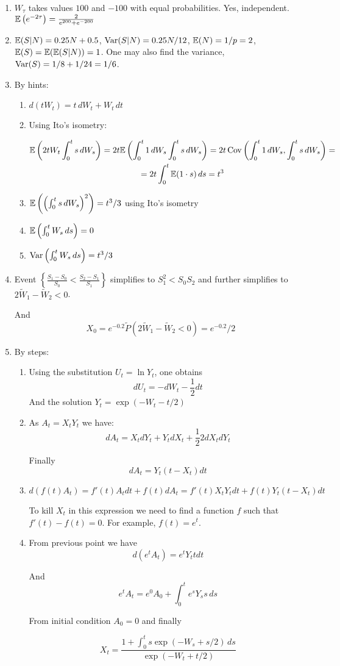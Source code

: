 \documentclass[12pt, a4paper]{article}
\begin{document}
\begin{enumerate}
\item $W_{\tau}$ takes values $100$ and $-100$ with equal probabilities. Yes, independent. $\mathbb{E}\left(  e^{-2\tau} \right) = \frac{2}{e^{200}+e^{-200}}$
\item $\mathbb{E}(S|N)=0.25N+0.5$, $\operatorname{Var}(S|N)=0.25N/12$, $\mathbb{E}(N)=1/p=2$, $\mathbb{E}(S)=\mathbb{E}(\mathbb{E}(S|N))=1$. One may also find the variance, $\operatorname{Var}(S)=1/8+1/24=1/6$.
\item By hints:
\begin{enumerate}
\item $d(tW_t)=t \, dW_t+W_t \, dt$
\item Using Ito's isometry:

\begin{multline}
\mathbb{E}\left(2t W_t\int_0^t s \, dW_s\right) = 2t \mathbb{E}\left(\int_0^t 1 \, dW_s \int_0^t s \, dW_s\right) =
2t \operatorname{Cov}\left(\int_0^t 1 \, dW_s, \int_0^t s \, dW_s\right) = \\
= 2t \int_0^t \mathbb{E}( 1 \cdot s) \, ds = t^3
\end{multline}



\item $\mathbb{E}\left(\left(\int_0^t s \, dW_s\right)^2 \right)=t^3/3$ using Ito's isometry
\item $\mathbb{E}\left(  \int_0^t W_s \, ds  \right)=0$
\item $\operatorname{Var}\left(  \int_0^t W_s \, ds  \right)=t^3/3$
\end{enumerate}
\item Event $\left\{ \frac{S_1-S_0}{S_0} < \frac{S_2-S_1}{S_1} \right\}$ simplifies to $S_1^2<S_0 S_2$ and further simplifies to $2\tilde{W}_1 - \tilde{W}_2 < 0$.

And
\[
X_0=e^{-0.2}\tilde{P}(2\tilde{W}_1 - \tilde{W}_2 < 0) = e^{-0.2}/2
\]

\item By steps:

\begin{enumerate}
\item Using the substitution $U_t=\ln Y_t$, one obtains
\[
dU_t= - dW_t - \frac{1}{2}dt
\]
And the solution $Y_t=\exp(-W_t-t/2)$
\item As $A_t = X_t Y_t$ we have:
\[
dA_t = X_t dY_t + Y_t dX_t + \frac{1}{2} 2 dX_t dY_t
\]

Finally
\[
dA_t= Y_t (t-X_t)dt
\]
\item
\[
d(f(t)A_t) = f'(t) A_t dt + f(t) dA_t = f'(t) X_t Y_t dt + f(t)Y_t (t - X_t)dt
\]

To kill $X_t$ in this expression we need to find a function $f$ such that $f'(t)- f(t)=0$. For example, $f(t)=e^t$.
\item From previous point we have
\[
d(e^t A_t) = e^t Y_t t dt
\]

And
\[
e^t A_t = e^0 A_0 + \int_0^t e^s Y_s s \, ds
\]

From initial condition $A_0=0$ and finally

\[
X_t=\frac{1+\int_0^t s \exp(-W_s+s/2) \, ds}{ \exp(-W_t +t/2 )}
\]
\end{enumerate}


\end{enumerate}
\end{document}
